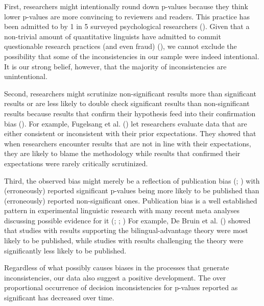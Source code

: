 \documentclass[
  doc,
  longtable,
  nolmodern,
  notxfonts,
  notimes,
  colorlinks=true,linkcolor=blue,citecolor=blue,urlcolor=blue]{apa7}
\begin{document}
First, researchers might intentionally round down p-values because they
think lower p-values are more convincing to reviewers and readers. This
practice has been admitted to by 1 in 5 surveyed psychological
researchers (). Given
that a non-trivial amount of quantitative linguists have admitted to
commit questionable research practices (and even fraud)
(), we cannot
exclude the possibility that some of the inconsistencies in our sample
were indeed intentional. It is our strong belief, however, that the
majority of inconsistencies are unintentional.

Second, researchers might scrutinize non-significant results more than
significant results or are less likely to double check significant
results than non-significant results because results that confirm their
hypothesis feed into their confirmation bias
(). For
example, Fugelsang et al. () let
researchers evaluate data that are either consistent or inconsistent
with their prior expectations. They showed that when researchers
encounter results that are not in line with their expectations, they are
likely to blame the methodology while results that confirmed their
expectations were rarely critically scrutinized.

Third, the observed bias might merely be a reflection of publication
bias (;
) with
(erroneously) reported significant p-values being more likely to be
published than (erroneously) reported non-significant ones. Publication
bias is a well established pattern in experimental linguistic research
with many recent meta analyses discussing possible evidence for it
(;
;
) For example, De Bruin et al.
() showed that studies with results
supporting the bilingual-advantage theory were most likely to be
published, while studies with results challenging the theory were
significantly less likely to be published.

Regardless of what possibly causes biases in the processes that generate
inconsistencies, our data also suggest a positive development. The over
proportional occurrence of decision inconsistencies for p-values
reported as significant has decreased over time.
\end{document}

